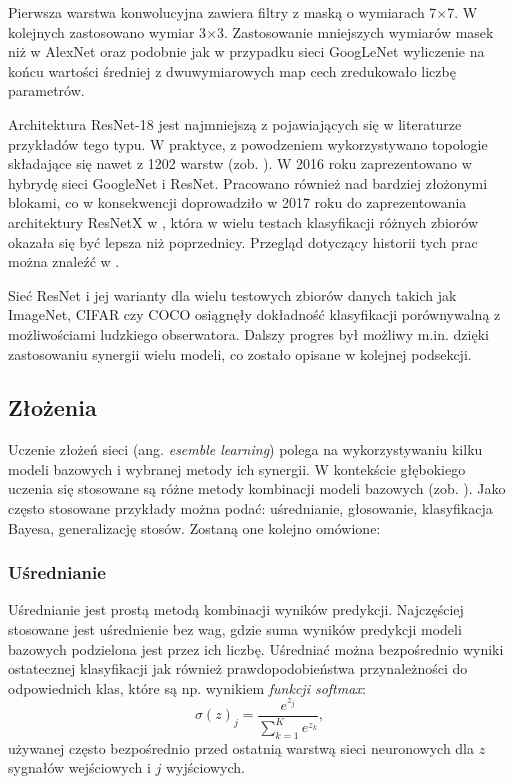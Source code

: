 Pierwsza warstwa konwolucyjna zawiera filtry z maską o wymiarach 7$\times$7. W kolejnych zastosowano wymiar 3$\times$3. Zastosowanie mniejszych wymiarów masek niż w AlexNet oraz podobnie jak w przypadku sieci GoogLeNet wyliczenie na końcu wartości średniej z dwuwymiarowych map cech zredukowało liczbę parametrów.

Architektura ResNet-18 jest najmniejszą z pojawiających się w literaturze przykładów tego typu. W praktyce, z powodzeniem wykorzystywano topologie składające się nawet z 1202 warstw (zob. \cite{ResNet}). W 2016 roku zaprezentowano w \cite{InceptionResNet} hybrydę sieci GoogleNet i ResNet. Pracowano również nad bardziej złożonymi blokami, co w konsekwencji doprowadziło w 2017 roku do zaprezentowania architektury ResNetX w \cite{ResNetX}, która w wielu testach klasyfikacji różnych zbiorów okazała się być lepsza niż poprzednicy. Przegląd dotyczący historii tych prac można znaleźć w \cite{ResNetXoverview}.

Sieć ResNet i jej warianty dla wielu testowych zbiorów danych takich jak ImageNet, CIFAR czy COCO \cite{COCO} osiągnęły dokładność klasyfikacji porównywalną z możliwościami ludzkiego obserwatora. Dalszy progres był możliwy m.in. dzięki zastosowaniu synergii wielu modeli, co zostało opisane w kolejnej podsekcji.

\subsection{Złożenia}
Uczenie złożeń sieci (ang. \textit{esemble learning}) polega na wykorzystywaniu kilku modeli bazowych i wybranej metody ich synergii. W kontekście głębokiego uczenia się stosowane są różne metody kombinacji modeli bazowych (zob. \cite{Ensemble}). Jako często stosowane przykłady można podać: uśrednianie, głosowanie, klasyfikacja Bayesa, generalizację stosów. Zostaną one kolejno omówione:

\subsubsection{Uśrednianie}
Uśrednianie jest prostą metodą kombinacji wyników predykcji. Najczęściej stosowane jest uśrednienie bez wag, gdzie suma wyników predykcji modeli bazowych podzielona jest przez ich liczbę. Uśredniać można bezpośrednio wyniki ostatecznej klasyfikacji jak również prawdopodobieństwa przynależności do odpowiednich klas, które są np. wynikiem \textit{funkcji softmax}:
\begin{equation}
\sigma (z)_j= \frac{e^{z_j}}{\sum_{k=1}^{K} e^{z_k}},
\end{equation} 
używanej często bezpośrednio przed ostatnią warstwą sieci neuronowych dla $z$ sygnałów wejściowych i $j$ wyjściowych.

